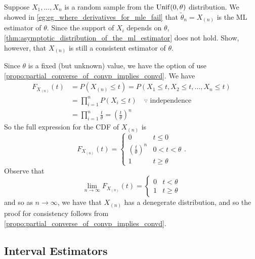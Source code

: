 \documentclass[notoc,notitlepage]{tufte-book}
\begin{document}
\begin{eg}
  Suppose $X_1, ..., X_n$ is a random sample from the $\operatorname{Unif}(0, \theta)$ distribution. We showed in \cref{eg:eg_where_derivatives_for_mle_fail} that $\tilde{\theta}_n = X_{(n)}$ is the ML estimator of $\theta$. Since the support of $X_i$ depends on $\theta$, \cref{thm:asymptotic_distribution_of_the_ml_estimator} does not hold. Show, however, that $X_{(n)}$ is still a consistent estimator of $\theta$.
\end{eg}

\begin{solution}
  Since $\theta$ is a fixed (but unknown) value, we have the option of use\\ \noindent \cref{propo:partial_converse_of_convp_implies_convd}. We have
  \begin{align*}
    F_{X_{(n)}}(t) &= P(X_{(n)} \leq t) = P(X_1 \leq t, X_2 \leq t, ..., X_n \leq t) \\
                   &= \prod_{i=1}^{n} P(X_i \leq t) \quad \because \text{ independence } \\
                   &= \prod_{i=1}^{n} \frac{t}{\theta} = \left( \frac{t}{\theta} \right)^n
  \end{align*}
  So the full expression for the CDF of $X_{(n)}$ is
  \begin{equation*}
    F_{X_{(n)}}(t) = \begin{cases}
      0 & t \leq 0 \\
      \left( \frac{t}{\theta} \right)^n & 0 < t < \theta \\
      1 & t \geq \theta
    \end{cases}.
  \end{equation*}
  Observe that
  \begin{equation*}
    \lim_{n \to \infty}F_{X_{(n)}}(t) = \begin{cases}
      0 & t < \theta \\
      1 & t \geq \theta
    \end{cases}
  \end{equation*}
  and so as $n \to \infty$, we have that $X_{(n)}$ has a denegerate distribution, and so the proof for consistency follows from \cref{propo:partial_converse_of_convp_implies_convd}.
\end{solution}


\subsection{Interval Estimators}%
\label{sub:interval_estimators}
\end{document}
